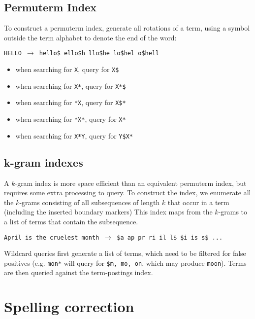 \documentclass{idc_msc}
\begin{document}
\subsection{Permuterm Index}

To construct a permuterm index, generate all rotations of a term, using a symbol outside the term alphabet to denote the end of the word:

\texttt{HELLO \(\to\) hello\$ ello\$h llo\$he lo\$hel o\$hell}

\begin{itemize}
  \item when searching for \texttt{X}, query for \texttt{X\$}
  \item when searching for \texttt{X*}, query for \texttt{X*\$}
  \item when searching for \texttt{*X}, query for \texttt{X\$*}
  \item when searching for \texttt{*X*}, query for \texttt{X*}
  \item when searching for \texttt{X*Y}, query for \texttt{Y\$X*}
\end{itemize}

\subsection{k-gram indexes}

A \(k\)-gram index is more space efficient than an equivalent permuterm index, but requires some extra processing to query.
To construct the index, we enumerate all the \(k\)-grams consisting of all subsequences of length \(k\) that occur in a term (including the inserted boundary markers)
This index maps from the \(k\)-grams to a list of terms that contain the subsequence.

\texttt{April is the cruelest month \(\to\) \$a ap pr ri il l\$ \$i is s\$ ...}

Wildcard queries first generate a list of terms, which need to be filtered for false positives (e.g. \texttt{mon*} will query for \texttt{\$m, mo, on}, which may produce \texttt{moon}).
Terms are then queried against the term-postings index.

\section{Spelling correction}

\end{document}
